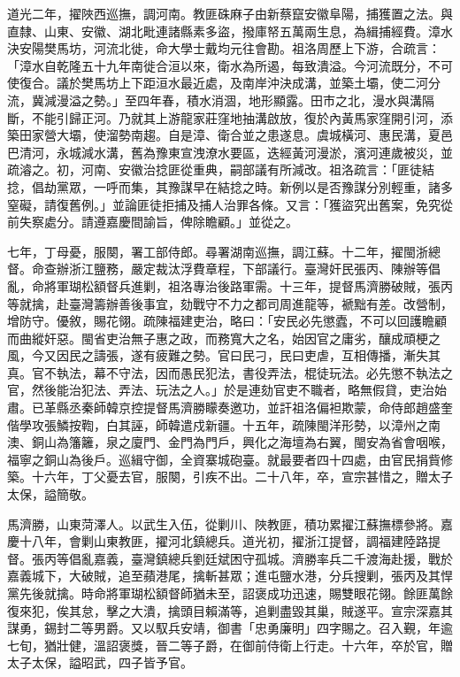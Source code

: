 \begin{pinyinscope}
道光二年，擢陜西巡撫，調河南。教匪硃麻子由新蔡竄安徽阜陽，捕獲置之法。與直隸、山東、安徽、湖北毗連諸縣素多盜，撥庫帑五萬兩生息，為緝捕經費。漳水決安陽樊馬坊，河流北徙，命大學士戴均元往會勘。祖洛周歷上下游，合疏言：「漳水自乾隆五十九年南徙合洹以來，衛水為所遏，每致潰溢。今河流既分，不可使復合。議於樊馬坊上下距洹水最近處，及南岸沖決成溝，並築土壩，使二河分流，冀減漫溢之勢。」至四年春，積水消涸，地形顯露。田市之北，漫水與溝隔斷，不能引歸正河。乃就其上游龍家莊窪地抽溝啟放，復於內黃馬家窪開引河，添築田家營大壩，使溜勢南趨。自是漳、衛合並之患遂息。虞城橫河、惠民溝，夏邑巴清河，永城減水溝，舊為豫東宣洩潦水要區，迭經黃河漫淤，濱河連歲被災，並疏濬之。初，河南、安徽治捻匪從重典，嗣部議有所減改。祖洛疏言：「匪徒結捻，倡劫黨眾，一呼而集，其豫謀早在結捻之時。新例以是否豫謀分別輕重，諸多窒礙，請復舊例。」並論匪徒拒捕及捕人治罪各條。又言：「獲盜究出舊案，免究從前失察處分。請遵嘉慶間諭旨，俾除瞻顧。」並從之。

七年，丁母憂，服闋，署工部侍郎。尋署湖南巡撫，調江蘇。十二年，擢閩浙總督。命查辦浙江鹽務，嚴定裁汰浮費章程，下部議行。臺灣奸民張丙、陳辦等倡亂，命將軍瑚松額督兵進剿，祖洛專治後路軍需。十三年，提督馬濟勝破賊，張丙等就擒，赴臺灣籌辦善後事宜，劾戰守不力之都司周進龍等，褫黜有差。改營制，增防守。優敘，賜花翎。疏陳福建吏治，略曰：「安民必先懲蠹，不可以回護瞻顧而曲縱奸惡。閩省吏治無子惠之政，而務寬大之名，始因官之庸劣，釀成頑梗之風，今又因民之譸張，遂有疲難之勢。官曰民刁，民曰吏虐，互相傳播，漸失其真。官不執法，幕不守法，因而愚民犯法，書役弄法，棍徒玩法。必先懲不執法之官，然後能治犯法、弄法、玩法之人。」於是連劾官吏不職者，略無假貸，吏治始肅。已革縣丞秦師韓京控提督馬濟勝矇奏邀功，並訐祖洛偏袒欺蒙，命侍郎趙盛奎偕學攻張鱗按鞫，白其誣，師韓遣戍新疆。十五年，疏陳閩洋形勢，以漳州之南澳、銅山為籓籬，泉之廈門、金門為門戶，興化之海壇為右翼，閩安為省會咽喉，福寧之銅山為後戶。巡緝守御，全資寨城砲臺。就最要者四十四處，由官民捐貲修築。十六年，丁父憂去官，服闋，引疾不出。二十八年，卒，宣宗甚惜之，贈太子太保，謚簡敬。

馬濟勝，山東菏澤人。以武生入伍，從剿川、陜教匪，積功累擢江蘇撫標參將。嘉慶十八年，會剿山東教匪，擢河北鎮總兵。道光初，擢浙江提督，調福建陸路提督。張丙等倡亂嘉義，臺灣鎮總兵劉廷斌困守孤城。濟勝率兵二千渡海赴援，戰於嘉義城下，大破賊，追至蘋港尾，擒斬甚眾；進屯鹽水港，分兵搜剿，張丙及其悍黨先後就擒。時命將軍瑚松額督師猶未至，詔褒成功迅速，賜雙眼花翎。餘匪萬餘復來犯，俟其怠，擊之大潰，擒頭目賴滿等，追剿盡毀其巢，賊遂平。宣宗深嘉其謀勇，錫封二等男爵。又以馭兵安靖，御書「忠勇廉明」四字賜之。召入覲，年逾七旬，猶壯健，溫詔褒獎，晉二等子爵，在御前侍衛上行走。十六年，卒於官，贈太子太保，謚昭武，四子皆予官。


\end{pinyinscope}
